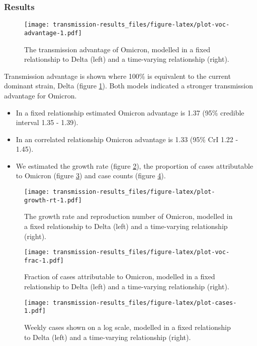 \documentclass[
]{article}
\providecommand{\tightlist}{%
  \setlength{\itemsep}{0pt}\setlength{\parskip}{0pt}}
\begin{document}
\hypertarget{results}{%
\subsubsection*{Results}\label{results}}

\begin{figure}
\centering
\texttt{[image: transmission-results\_files/figure-latex/plot-voc-advantage-1.pdf]}
\caption{\label{fig:plot-voc-advantage}The transmission advantage of Omicron, modelled in a fixed relationship to Delta (left) and a time-varying relationship (right).}
\end{figure}

Transmission advantage is shown where 100\% is equivalent to the current dominant strain, Delta (figure \ref{fig:plot-voc-advantage}). Both models indicated a stronger transmission advantage for Omicron.

\begin{itemize}
\tightlist
\item
  In a fixed relationship estimated Omicron advantage is 1.37 (95\% credible interval 1.35 - 1.39).
\item
  In an correlated relationship Omicron advantage is 1.33 (95\% CrI 1.22 - 1.45).
\item
  We estimated the growth rate (figure \ref{fig:plot-growth-rt}), the proportion of cases attributable to Omicron (figure \ref{fig:plot-voc-frac}) and case counts (figure \ref{fig:plot-cases}).
\end{itemize}

\begin{figure}
\centering
\texttt{[image: transmission-results\_files/figure-latex/plot-growth-rt-1.pdf]}
\caption{\label{fig:plot-growth-rt}The growth rate and reproduction number of Omicron, modelled in a fixed relationship to Delta (left) and a time-varying relationship (right).}
\end{figure}

\begin{figure}
\centering
\texttt{[image: transmission-results\_files/figure-latex/plot-voc-frac-1.pdf]}
\caption{\label{fig:plot-voc-frac}Fraction of cases attributable to Omicron, modelled in a fixed relationship to Delta (left) and a time-varying relationship (right).}
\end{figure}

\begin{figure}
\centering
\texttt{[image: transmission-results\_files/figure-latex/plot-cases-1.pdf]}
\caption{\label{fig:plot-cases}Weekly cases shown on a log scale, modelled in a fixed relationship to Delta (left) and a time-varying relationship (right).}
\end{figure}
\end{document}
